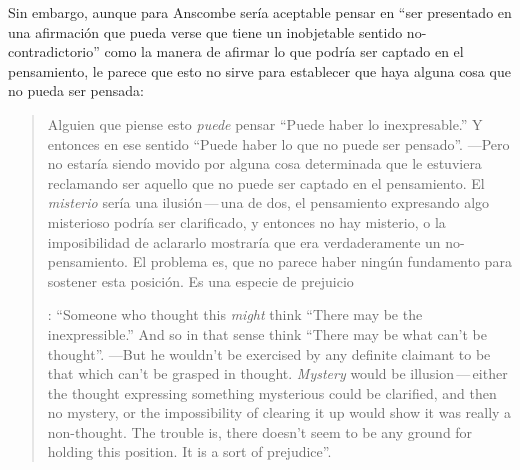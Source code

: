 Sin embargo, aunque para Anscombe sería aceptable pensar en ``ser presentado en una afirmación que pueda verse que tiene un inobjetable sentido no-contradictorio'' como la manera de afirmar lo que podría ser captado en el pensamiento, le parece que esto no sirve para establecer que haya alguna cosa que no pueda ser pensada: \blockquote[{\Cite[8]{anscombe1981parmenides:pmc}}: \enquote{Someone who thought this \emph{might} think ``There may be the inexpressible.'' And so in that sense think ``There may be what can't be thought''. ---But he wouldn't be exercised by any definite claimant to be that which can't be grasped in thought. \emph{Mystery} would be illusion\,---\,either the thought expressing something mysterious could be clarified, and then no mystery, or the impossibility of clearing it up would show it was really a non-thought. The trouble is, there doesn't seem to be any ground for holding this position. It is a sort of prejudice}.]{Alguien que piense esto \emph{puede} pensar ``Puede haber lo inexpresable.'' Y entonces en ese sentido ``Puede haber lo que no puede ser pensado''. ---Pero no estaría siendo movido por alguna cosa determinada que le estuviera reclamando ser aquello que no puede ser captado en el pensamiento. El \emph{misterio} sería una ilusión\,---\,una de dos, el pensamiento expresando algo misterioso podría ser clarificado, y entonces no hay misterio, o la imposibilidad de aclararlo mostraría que era verdaderamente un no-pensamiento. El problema es, que no parece haber ningún fundamento para sostener esta posición. Es una especie de prejuicio}.

